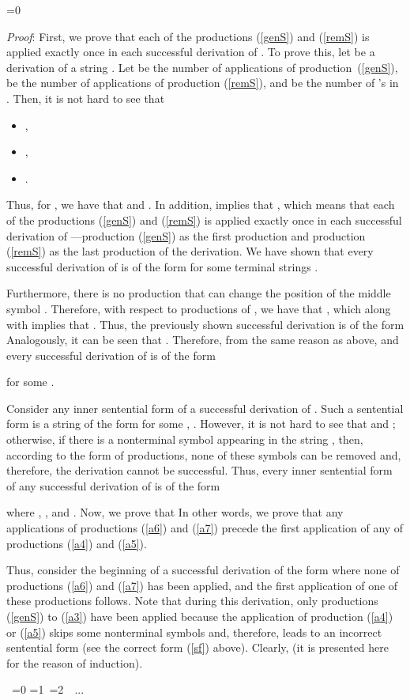 \documentclass[copyright]{eptcs}
\makeatletter
\newcounter{d@proof}\let\thed@proof\relax\setcounter{d@proof}{0}
\newcommand*{\qed}{}
\newenvironment{proof}{\ifnum \value{d@proof}=0{\setcounter{claim}{0}}\else\fi
  \stepcounter{d@proof}\par\noindent
  {\rmfamily\itshape\mdseries Proof\/}:\hspace{\labelsep}\ignorespaces}{\addtocounter{d@proof}{-1}\mbox{}\nolinebreak\hfill~\ifnum \value{d@proof}=0{\qed}\else
    \ifnum \value{d@proof}=1{\qed\nolinebreak\,\nolinebreak\qed}\else
      \ifnum \value{d@proof}=2{\qed\nolinebreak\,\nolinebreak\qed
          \nolinebreak\,\nolinebreak\qed}\else
        {\qed\nolinebreak...\nolinebreak\qed}\fi\fi\fi
  \medbreak
}
\makeatother
\begin{document}
\begin{proof}
    First, we prove that each of the productions (\ref{genS}) and (\ref{remS}) is applied exactly once in each successful derivation of . To prove this, let  be a derivation of a string . Let  be the number of applications of production~(\ref{genS}),  be the number of applications of production (\ref{remS}), and  be the number of 's in . Then, it is not hard to see that
    \begin{itemize}
      \item ,
      \item ,
      \item .
    \end{itemize}
    Thus, for , we have that  and . In addition,  implies that , which means that each of the productions (\ref{genS}) and (\ref{remS}) is applied exactly once in each successful derivation of ---production (\ref{genS}) as the first production and production (\ref{remS}) as the last production of the derivation. We have shown that every successful derivation of  is of the form  for some terminal strings .

    Furthermore, there is no production that can change the position of the middle 
    symbol . Therefore, with respect to productions of , we have 
    that
    , which along with  implies that . Thus, the previously shown successful derivation is of the form  Analogously, it can be seen that . Therefore, from the same reason as above,  and every successful derivation of  is of the form
    
    for some .

    Consider any inner sentential form of a successful derivation of . Such a sentential form is a string of the form  for some , . However, it is not hard to see that  and ; otherwise, if there is a nonterminal symbol appearing in the string , then, according to the form of productions, none of these symbols can be removed and, therefore, the derivation cannot be successful. Thus, every inner sentential form of any successful derivation of  is of the form
    
    where , , and . Now, we prove that  In other words, we prove that any applications of productions (\ref{a6}) and (\ref{a7}) precede the first application of any of productions (\ref{a4}) and (\ref{a5}).

    Thus, consider the beginning of a successful derivation of the form  where none of productions (\ref{a6}) and (\ref{a7}) has been applied, and the first application of one of these productions follows. Note that during this derivation, only productions (\ref{genS}) to (\ref{a3}) have been applied because the application of production (\ref{a4}) or (\ref{a5}) skips some nonterminal symbols and, therefore, leads to an incorrect sentential form (see the correct form (\ref{sf}) above). Clearly,  (it is presented here for the reason of induction).


\end{proof}
\end{document}
